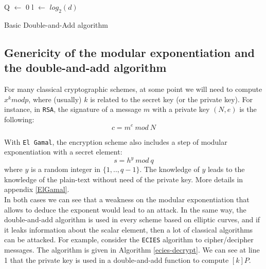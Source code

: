 \documentclass[journal]{IEEEtran}
\begin{document}
\begin{algorithm}
    \SetAlgoLined %
   
    \SetSideCommentLeft 
    \SetNoFillComment

    
    
    Q $\leftarrow$ 0\;
    l $\leftarrow$ $log_2(d)$\;

    \bigskip

    \caption{Basic Double-and-Add algorithm}
    \label{d-and-a-algo}

\end{algorithm}

\subsection{Genericity of the modular exponentiation and the double-and-add algorithm}
\label{genericity}
For many classical cryptographic schemes, 
at some point we will need to compute $x^k mod p$, where (usually) $k$ is related to the secret key (or the private key). For instance, in {\tt RSA}, 
the signature of a message $m$ with a private key $(N, e)$ is the following: 
$$ c = m^e~mod~N $$

With {\tt El Gamal}, the encryption scheme also includes a step of modular exponentiation with a secret element:
$$ s = h^y~mod~q$$
where $y$ is a random integer in $\{1, .., q-1\}$. The knowledge of $y$ leads to the knowledge of the plain-text without need of the private key. 
More details in appendix \ref{ElGamal}.\\

In both cases we can see that a weakness on the modular exponentiation that allows to deduce the exponent would lead to an attack.
In the same way, the double-and-add algorithm is used in every scheme based on elliptic curves, and if it leaks information about the 
scalar element, then a lot of classical algorithms can be attacked. For example, consider the {\tt ECIES} algorithm to cipher/decipher messages. 
The algorithm is given in Algorithm \ref{ecies-decrypt}. We can see at line 1 that the private key is used in a double-and-add function to compute
$[k]P$. 
\end{document}

